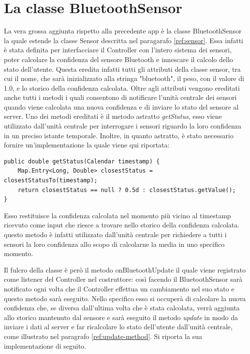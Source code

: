 \section{La classe BluetoothSensor}\label{chap:btSensor}
La vera grossa aggiunta rispetto alla precedente app è la classe BluetoothSensor la quale estende la classe Sensor descritta nel paragarafo \ref{ref:sensor}. Essa infatti è stata definita per interfacciare il Controller con l'intero sistema dei sensori, poter calcolare la confidenza del sensore Bluetooth e innescare il calcolo dello stato dell'utente. Questa eredita infatti tutti gli attributi della classe sensor, tra cui il nome, che sarà inizializzato alla stringa "bluetooth", il peso, con il valore di 1.0, e lo storico della confidenza calcolata. Oltre agli attributi vengono ereditati anche tutti i metodi i quali consentono di notificare l'unità centrale dei sensori quando viene calcolata una nuova confidenza e di inviare lo stato del sensore al server. Uno dei metodi ereditati è il metodo astratto \textit{getStatus}, esso viene utilizzato dall'unità centrale per interrogare i sensori riguardo la loro confidenza in un preciso istante temporale. Inoltre, in quanto astratto, è stato necessario fornire un'implementazione la quale viene qui riportata:
\begin{verbatim}
public double getStatus(Calendar timestamp) {
    Map.Entry<Long, Double> closestStatus = closestStatusTo(timestamp);
    return closestStatus == null ? 0.5d : closestStatus.getValue();
}
\end{verbatim}
Esso restituisce la confidenza calcolata nel momento più vicino al timestamp ricevuto come input che riesce a trovare nello storico della confidenza calcolata. questo metodo è infatti utilizzato dall'unità centrale per richiedere a tutti i sensori la loro confidenza allo scopo di calcolarne la media in uno specifico momento.

Il fulcro della classe è però il metodo onBluetoothUpdate il quale viene registrato come listener del Controller nel costruttore: così facendo il BluetoothSensor sarà notificato ogni volta che il Controller effettua un cambiamento nel suo stato e questo metodo sarà eseguito. Nello specifico esso si occuperà di calcolare la nuova confidenza che, se diversa dall'ultima volta che è stata calcolata, verrà aggiunta allo storico mantenuto dal sensore e sarà eseguito il metodo \textit{update} in modo da inviare i dati al server e far ricalcolare lo stato dell'utente dall'unità centrale, come illustrato nel paragrafo \ref{ref:update-method}. Si riporta la sua implementazione di seguito.

